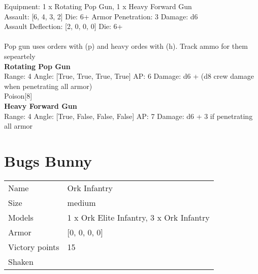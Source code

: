 Equipment: 1 x Rotating Pop Gun, 1 x Heavy Forward Gun \\

Assault: [6, 4, 3, 2] Die: 6+ Armor Penetration: 3 Damage: d6 \\
Assault Deflection: [2, 0, 0, 0] Die: 6+\\
\\ 
 

Pop gun uses orders with (p) and heavy ordes with (h). Track ammo for them sepeartely\\ 


{\bf Rotating Pop Gun } \\



Range: 4  Angle: [True, True, True, True] AP: 6 Damage: d6 + (d8 crew damage when penetrating all armor) \\
Poison[8]\\ 




{\bf Heavy Forward Gun } \\



Range: 4  Angle: [True, False, False, False] AP: 7 Damage: d6 + 3 if penetrating all armor \\




 















\clearpage

\section{ Bugs Bunny }

\begin{tabular}{ll}
  Name & Ork Infantry \\
  Size & medium\\
  Models & 1 x Ork Elite Infantry, 3 x Ork Infantry\\
  Armor & [0, 0, 0, 0]\\
  Victory points & 15\\
  Shaken & \\
\end{tabular}


